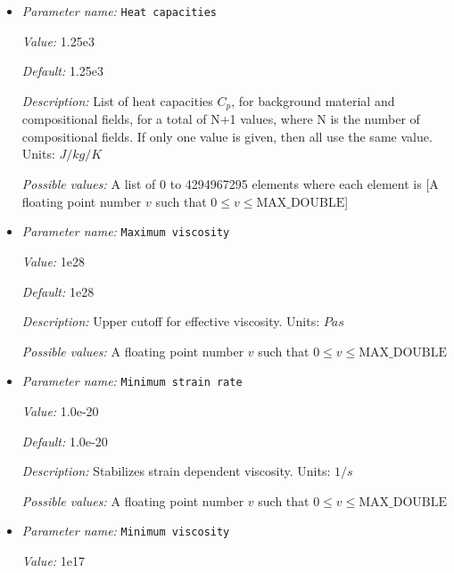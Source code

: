 \begin{itemize}
{\it Possible values:} A list of 0 to 4294967295 elements where each element is [A floating point number $v$ such that $0 \leq v \leq \text{MAX\_DOUBLE}$]
\item {\it Parameter name:} {\tt Heat capacities}
\label{parameters:Material model/Visco Plastic/Heat capacities}


{\it Value:} 1.25e3


{\it Default:} 1.25e3


{\it Description:} List of heat capacities $C_p$, for background material and compositional fields, for a total of N+1 values, where N is the number of compositional fields. If only one value is given, then all use the same value.  Units: $J/kg/K$


{\it Possible values:} A list of 0 to 4294967295 elements where each element is [A floating point number $v$ such that $0 \leq v \leq \text{MAX\_DOUBLE}$]
\item {\it Parameter name:} {\tt Maximum viscosity}
\label{parameters:Material model/Visco Plastic/Maximum viscosity}


{\it Value:} 1e28


{\it Default:} 1e28


{\it Description:} Upper cutoff for effective viscosity. Units: $Pa s$


{\it Possible values:} A floating point number $v$ such that $0 \leq v \leq \text{MAX\_DOUBLE}$
\item {\it Parameter name:} {\tt Minimum strain rate}
\label{parameters:Material model/Visco Plastic/Minimum strain rate}


{\it Value:} 1.0e-20


{\it Default:} 1.0e-20


{\it Description:} Stabilizes strain dependent viscosity. Units: $1 / s$


{\it Possible values:} A floating point number $v$ such that $0 \leq v \leq \text{MAX\_DOUBLE}$
\item {\it Parameter name:} {\tt Minimum viscosity}
\label{parameters:Material model/Visco Plastic/Minimum viscosity}


{\it Value:} 1e17



\end{itemize}
